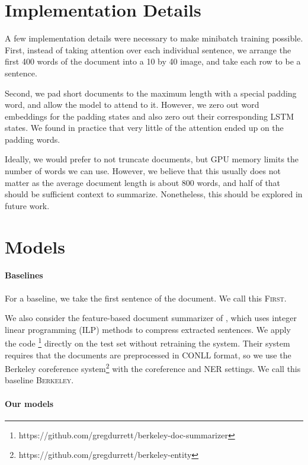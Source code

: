 \documentclass[12pt]{report}
\begin{document}
\section{Implementation Details}

A few implementation details were necessary to make minibatch training possible. First, instead of taking attention over each individual sentence, we arrange the first 400 words of the document into a 10 by 40 image, and take each row to be a sentence.

Second, we pad short documents to the maximum length with a special padding word, and allow the model to attend to it. However, we zero out word embeddings for the padding states and also zero out their corresponding LSTM states. We found in practice that very little of the attention ended up on the padding words.

Ideally, we would prefer to not truncate documents, but GPU memory limits the number of words we can use. However, we believe that this usually does not matter as the average document length is about 800 words, and half of that should be sufficient context to summarize. Nonetheless, this should be explored in future work.

\section{Models}

\paragraph{Baselines}
For a baseline, we take the first sentence of the document. We call this \textsc{First}.

We also consider the feature-based document summarizer of \citet{Durrett2016}, which uses integer linear programming (ILP) methods to compress extracted sentences. We apply the code \footnote{https://github.com/gregdurrett/berkeley-doc-summarizer} directly on the test set without retraining the system. Their system requires that the documents are preprocessed in CONLL format, so we use the Berkeley coreference system\footnote{https://github.com/gregdurrett/berkeley-entity} with the coreference and NER settings. We call this baseline \textsc{Berkeley}.

\paragraph{Our models}
\end{document}

